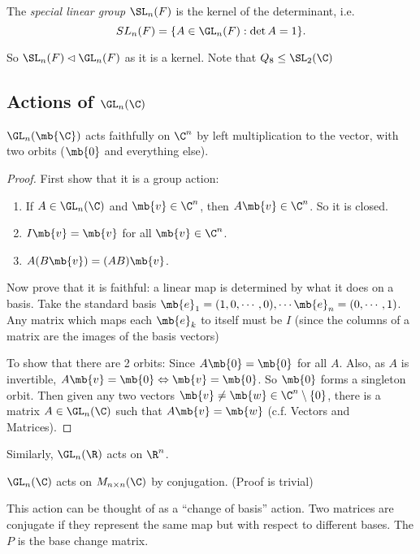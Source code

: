 \documentclass[a4pape]{article}
\begin{document}
\begin{defi}
  The \emph{special linear group} $\SL_n(F)$ is the kernel of the determinant, i.e.
  \[
  SL_n(F) = \{A\in \GL_n(F): \det A = 1\}.
  \]
\end{defi}

So $\SL_n(F)\lhd \GL_n(F)$ as it is a kernel. Note that $Q_8\leq \SL_2(\C)$
\subsection{Actions of \texorpdfstring{$\GL_n(\C)$}{GLn(C)}}
\begin{prop}
  $\GL_n(\mb{\C})$ acts faithfully on $\C^n$ by left multiplication to the vector, with two orbits ($\mb{0}$ and everything else).
\end{prop}

\begin{proof}
  First show that it is a group action:
  \begin{enumerate}[label=\arabic{*}.]
    \setcounter{enumi}{0}
  \item If $A\in \GL_n(\C)$ and $\mb{v}\in \C^n$, then $A\mb{v}\in \C^n$. So it is closed.
  \item $I\mb{v} = \mb{v}$ for all $\mb{v}\in \C^n$.
  \item $A(B\mb{v}) = (AB)\mb{v}$.
  \end{enumerate}

  Now prove that it is faithful: a linear map is determined by what it does on a basis. Take the standard basis $\mb{e}_1 = (1, 0, \cdots, 0), \cdots \mb{e}_n = (0, \cdots, 1)$. Any matrix which maps each $\mb{e}_k$ to itself must be $I$ (since the columns of a matrix are the images of the basis vectors)

  To show that there are 2 orbits: Since $A\mb{0} = \mb{0}$ for all $A$. Also, as $A$ is invertible, $A\mb{v} = \mb{0}\Leftrightarrow \mb{v} = \mb{0}$. So $\mb{0}$ forms a singleton orbit. Then given any two vectors $\mb{v}\not= \mb{w}\in \C^n\setminus\{0\}$, there is a matrix $A\in \GL_n(\C)$ such that $A\mb{v} = \mb{w}$ (c.f. Vectors and Matrices).
\end{proof}

Similarly, $\GL_n(\R)$ acts on $\R^n$.

\begin{prop}
  $\GL_n(\C)$ acts on $M_{n\times n}(\C)$ by conjugation. (Proof is trivial)
\end{prop}
This action can be thought of as a ``change of basis'' action. Two matrices are conjugate if they represent the same map but with respect to different bases. The $P$ is the base change matrix.
\end{document}
